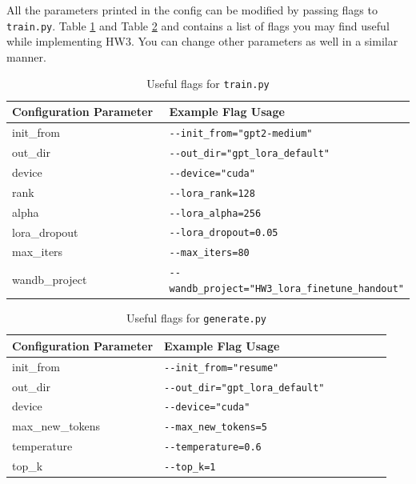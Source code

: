 \documentclass[11pt,addpoints,answers]{exam}
\begin{document}
\begin{questions}
\begin{enumerate}
\end{enumerate}


All the parameters printed in the config can be modified by passing flags to \lstinline{train.py}. Table \ref{table:flag1} and Table \ref{table:flag2} and contains a list of flags you may find useful while implementing HW3. You can change other parameters as well in a similar manner.

\begin{table}[h!]
\centering
\begin{tabular}{|p{0.4\linewidth}|p{0.6\linewidth}|}
\hline
Configuration Parameter & Example Flag Usage \\ \hline
init\_from &  \lstinline|--init_from="gpt2-medium"|  \\ \hline
out\_dir &  \lstinline|--out_dir="gpt_lora_default"| \\ \hline
device & \lstinline|--device="cuda"| \\ \hline
 rank &  \lstinline|--lora_rank=128|  \\ \hline
alpha &  \lstinline|--lora_alpha=256|  \\ \hline
lora\_dropout & \lstinline|--lora_dropout=0.05| \\ \hline
max\_iters &  \lstinline|--max_iters=80| \\ \hline
wandb\_project &  \lstinline|--wandb_project="HW3_lora_finetune_handout"| \\ \hline
\end{tabular}
\caption{Useful flags for \lstinline{train.py}}
\label{table:flag1}
\end{table}

\begin{table}[h!]
\centering
\begin{tabular}{|p{0.4\linewidth}|p{0.6\linewidth}|}
\hline
Configuration Parameter & Example Flag Usage \\ \hline
init\_from & \lstinline|--init_from="resume"| \\ \hline
out\_dir &  \lstinline|--out_dir="gpt_lora_default"| \\ \hline
device & \lstinline|--device="cuda"| \\ \hline
max\_new\_tokens & \lstinline|--max_new_tokens=5| \\ \hline
temperature & \lstinline|--temperature=0.6| \\ \hline
top\_k & \lstinline|--top_k=1| \\ \hline
\end{tabular}
\caption{Useful flags for \lstinline{generate.py}}
\label{table:flag2}
\end{table}



\end{questions}
\end{document}
